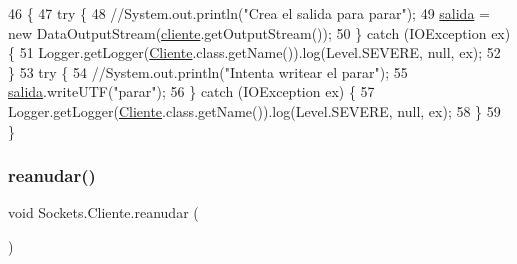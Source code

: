 \begin{DoxyCode}
46     \{
47         \textcolor{keywordflow}{try} \{
48             \textcolor{comment}{//System.out.println("Crea el salida para parar");}
49             \mbox{\hyperlink{class_sockets_1_1_cliente_a0e85d127bffa834dc946bb2c39a8a7a2}{salida}} = \textcolor{keyword}{new} DataOutputStream(\mbox{\hyperlink{class_sockets_1_1_cliente_afe26e0d4cbe42f094ce76f958e15fb58}{cliente}}.getOutputStream());
50         \} \textcolor{keywordflow}{catch} (IOException ex) \{
51             Logger.getLogger(\mbox{\hyperlink{class_sockets_1_1_cliente_ab3aed9d5de2bafbb190c27a9c5e7cfd1}{Cliente}}.class.getName()).log(Level.SEVERE, null, ex);
52         \}
53         \textcolor{keywordflow}{try} \{
54             \textcolor{comment}{//System.out.println("Intenta writear el parar");}
55             \mbox{\hyperlink{class_sockets_1_1_cliente_a0e85d127bffa834dc946bb2c39a8a7a2}{salida}}.writeUTF(\textcolor{stringliteral}{"parar"});
56         \} \textcolor{keywordflow}{catch} (IOException ex) \{
57             Logger.getLogger(\mbox{\hyperlink{class_sockets_1_1_cliente_ab3aed9d5de2bafbb190c27a9c5e7cfd1}{Cliente}}.class.getName()).log(Level.SEVERE, null, ex);
58         \}
59     \}
\end{DoxyCode}
\mbox{\label{class_sockets_1_1_cliente_ae2687fb804fba298cfa152bf078f6795}} 
\subsubsection{\texorpdfstring{reanudar()}{reanudar()}}
{\footnotesize\ttfamily void Sockets.\+Cliente.\+reanudar (\begin{DoxyParamCaption}{ }\end{DoxyParamCaption})\hspace{0.3cm}{\ttfamily [inline]}}


